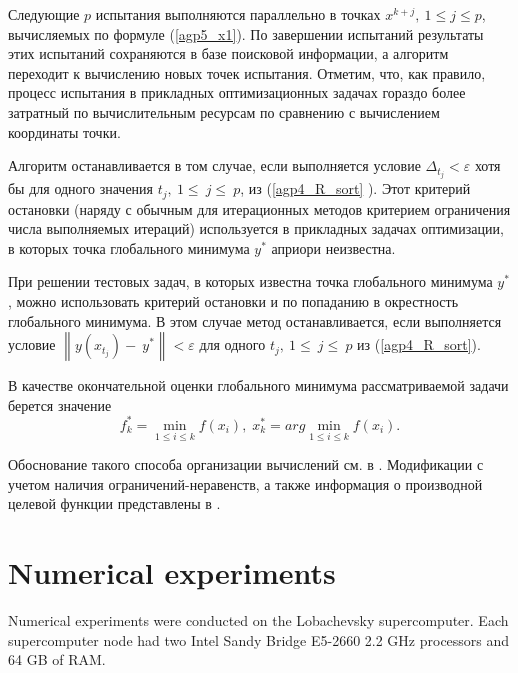 \documentclass[runningheads]{llncs}
\begin{document}
Следующие $p$ испытания выполняются параллельно в точках $x^{k+j},\ 1\leq j\leq p$, вычисляемых по формуле (\ref{agp5_x1}). По завершении испытаний результаты этих испытаний сохраняются в базе поисковой информации, а алгоритм переходит к вычислению новых точек испытания.
Отметим, что, как правило, процесс испытания в прикладных оптимизационных задачах гораздо более затратный по вычислительным ресурсам по сравнению с вычислением координаты точки.

Алгоритм останавливается в том случае, если выполняется условие \(\Delta_{t_j} < \varepsilon\) хотя бы для одного значения $t_j,\ 1\le\ j\le\ p$, из (\ref{agp4_R_sort} ). Этот критерий остановки (наряду с обычным для итерационных методов критерием ограничения числа выполняемых итераций) используется в прикладных задачах оптимизации, в которых точка глобального минимума $y^*$ априори неизвестна.

При решении тестовых задач, в которых известна точка глобального минимума $y^*$, можно использовать критерий остановки и по попаданию в окрестность глобального минимума. В этом случае метод останавливается, если выполняется условие $\left\|y(x_{t_j})-\ y^\ast\right\| < \varepsilon$ для одного $t_j,\ 1\le\ j\le\ p$ из (\ref{agp4_R_sort}).

В качестве окончательной оценки глобального минимума рассматриваемой задачи берется значение 
\begin{equation} 
	f_k^*=\min_{1\leq i \leq k}f(x_i), \; x_k^*=arg \min_{1\leq i \leq k}f(x_i). 
\end{equation} 


Обоснование такого способа организации вычислений см. в \cite{Strongin2000,Barkalov2016}. Модификации с учетом наличия ограничений-неравенств, а также информация о производной целевой функции представлены в \cite{Barkalov2002, Gergel1997, Barkalov2023, Gegrel2021}.





\section{Numerical experiments}\label{SecR}

Numerical experiments were conducted on the Lobachevsky supercomputer. Each supercomputer node had two Intel Sandy Bridge E5-2660 2.2 GHz processors and 64 GB of RAM.
\end{document}
